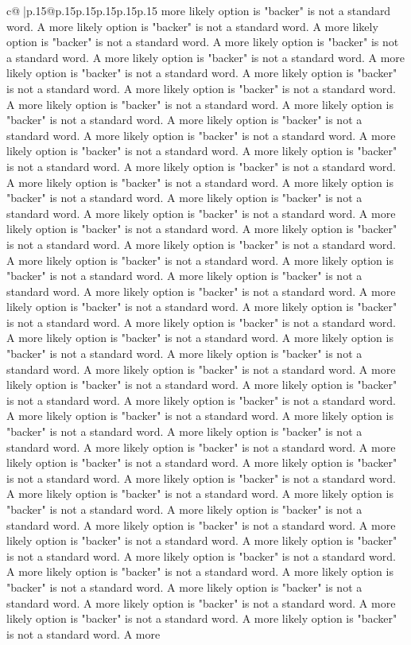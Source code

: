 \documentclass{article}
\begin{document}
{\begin{supertabular}{c@{$\;$}|p{.15\linewidth}@{}p{.15\linewidth}p{.15\linewidth}p{.15\linewidth}p{.15\linewidth}p{.15\linewidth}}
{{{more likely option is "backer" is not a standard word. A more likely option is "backer" is not a standard word. A more likely option is "backer" is not a standard word. A more likely option is "backer" is not a standard word. A more likely option is "backer" is not a standard word. A more likely option is "backer" is not a standard word. A more likely option is "backer" is not a standard word. A more likely option is "backer" is not a standard word. A more likely option is "backer" is not a standard word. A more likely option is "backer" is not a standard word. A more likely option is "backer" is not a standard word. A more likely option is "backer" is not a standard word. A more likely option is "backer" is not a standard word. A more likely option is "backer" is not a standard word. A more likely option is "backer" is not a standard word. A more likely option is "backer" is not a standard word. A more likely option is "backer" is not a standard word. A more likely option is "backer" is not a standard word. A more likely option is "backer" is not a standard word. A more likely option is "backer" is not a standard word. A more likely option is "backer" is not a standard word. A more likely option is "backer" is not a standard word. A more likely option is "backer" is not a standard word. A more likely option is "backer" is not a standard word. A more likely option is "backer" is not a standard word. A more likely option is "backer" is not a standard word. A more likely option is "backer" is not a standard word. A more likely option is "backer" is not a standard word. A more likely option is "backer" is not a standard word. A more likely option is "backer" is not a standard word. A more likely option is "backer" is not a standard word. A more likely option is "backer" is not a standard word. A more likely option is "backer" is not a standard word. A more likely option is "backer" is not a standard word. A more likely option is "backer" is not a standard word. A more likely option is "backer" is not a standard word. A more likely option is "backer" is not a standard word. A more likely option is "backer" is not a standard word. A more likely option is "backer" is not a standard word. A more likely option is "backer" is not a standard word. A more likely option is "backer" is not a standard word. A more likely option is "backer" is not a standard word. A more likely option is "backer" is not a standard word. A more likely option is "backer" is not a standard word. A more likely option is "backer" is not a standard word. A more likely option is "backer" is not a standard word. A more likely option is "backer" is not a standard word. A more likely option is "backer" is not a standard word. A more likely option is "backer" is not a standard word. A more likely option is "backer" is not a standard word. A more likely option is "backer" is not a standard word. A more likely option is "backer" is not a standard word. A more likely option is "backer" is not a standard word. A more likely option is "backer" is not a standard word. A more likely option is "backer" is not a standard word. A more likely option is "backer" is not a standard word. A more }}}
\end{supertabular}}
\end{document}
